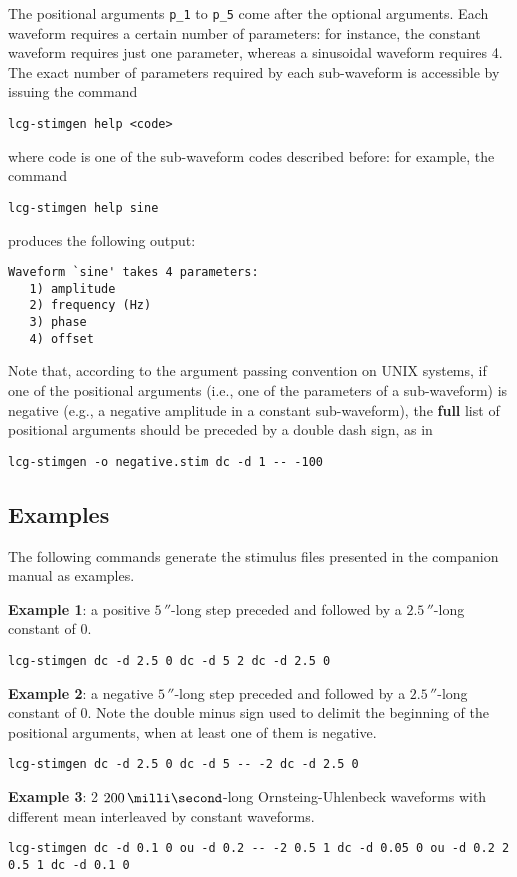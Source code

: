 The positional arguments \verb+p_1+ to \verb+p_5+ come after the
optional arguments. Each waveform requires a certain number of
parameters: for instance, the constant waveform requires just one
parameter, whereas a sinusoidal waveform requires 4. The exact number
of parameters required by each sub-waveform is accessible by issuing
the command
\begin{lstlisting}
lcg-stimgen help <code>
\end{lstlisting}
where code is one of the sub-waveform codes described before: for
example, the command
\begin{lstlisting}
lcg-stimgen help sine
\end{lstlisting}
produces the following output:
\begin{verbatim}
Waveform `sine' takes 4 parameters:
   1) amplitude
   2) frequency (Hz)
   3) phase
   4) offset
\end{verbatim}
Note that, according to the argument passing convention on UNIX
systems, if one of the positional arguments (i.e., one of the
parameters of a sub-waveform) is negative (e.g., a negative amplitude
in a constant sub-waveform), the \textbf{full} list of positional
arguments should be preceded by a double dash sign, as in
\begin{lstlisting}
lcg-stimgen -o negative.stim dc -d 1 -- -100
\end{lstlisting}

\subsection{Examples}
The following commands generate the stimulus files presented in the
companion manual as examples.

\textbf{Example 1}: a positive $5\,\second$-long step preceded and
followed by a $2.5\,\second$-long constant of 0.
\begin{lstlisting}
lcg-stimgen dc -d 2.5 0 dc -d 5 2 dc -d 2.5 0
\end{lstlisting}

\textbf{Example 2}: a negative $5\,\second$-long step preceded and
followed by a $2.5\,\second$-long constant of 0. Note the double minus
sign used to delimit the beginning of the positional arguments, when
at least one of them is negative.
\begin{lstlisting}
lcg-stimgen dc -d 2.5 0 dc -d 5 -- -2 dc -d 2.5 0
\end{lstlisting}

\textbf{Example 3}: 2 $200\,\milli\second$-long Ornsteing-Uhlenbeck
waveforms with different mean interleaved by constant waveforms.
\begin{lstlisting}
lcg-stimgen dc -d 0.1 0 ou -d 0.2 -- -2 0.5 1 dc -d 0.05 0 ou -d 0.2 2 0.5 1 dc -d 0.1 0
\end{lstlisting}

